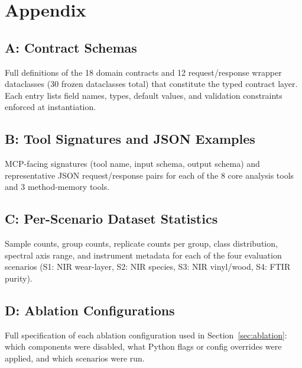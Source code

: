 
\section*{Appendix}
\label{sec:appendix}

\subsection*{A: Contract Schemas}
\label{app:contracts}

Full definitions of the 18 domain contracts and 12 request/response wrapper
dataclasses (30 frozen dataclasses total) that constitute the typed contract layer.
Each entry lists field names, types, default values, and validation
constraints enforced at instantiation.

\subsection*{B: Tool Signatures and JSON Examples}
\label{app:tool_signatures}

MCP-facing signatures (tool name, input schema, output schema) and
representative JSON request/response pairs for each of the 8 core analysis
tools and 3 method-memory tools.

\subsection*{C: Per-Scenario Dataset Statistics}
\label{app:dataset_stats}

Sample counts, group counts, replicate counts per group, class distribution,
spectral axis range, and instrument metadata for each of the four evaluation
scenarios (S1: NIR wear-layer, S2: NIR species, S3: NIR vinyl/wood,
S4: FTIR purity).

\subsection*{D: Ablation Configurations}
\label{app:ablation}

Full specification of each ablation configuration used in
Section~\ref{sec:ablation}: which components were disabled, what Python
flags or config overrides were applied, and which scenarios were run.

